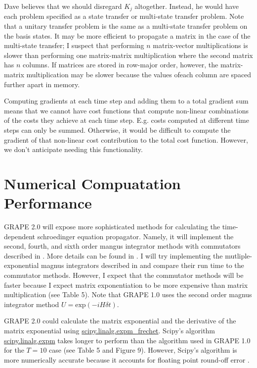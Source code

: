 \documentclass[letterpaper, 12pt]{article}
\begin{document}
Dave believes that we should disregard $K_{j}$ altogether. Instead, he would have each problem specified as a state transfer or multi-state transfer problem. Note that a unitary transfer problem is the same as a multi-state transfer problem on the basis states. It may be more efficient to propagate a matrix in the case of the multi-state transfer; I suspect that performing $n$ matrix-vector multiplications is slower than performing one matrix-matrix multiplication where the second matrix has $n$ columns. If matrices are stored in row-major order, however, the matrix-matrix multiplication may be slower because the values ofeach column are spaced further apart in memory.

Computing gradients at each time step and adding them to a total gradient sum means that we cannot have cost functions that compute non-linear combinations of the costs they achieve at each time step. E.g. costs computed at different time steps can only be summed. Otherwise, it would be difficult to compute the gradient of that non-linear cost contribution to the total cost function. However, we don't anticipate needing this functionality.

\section{Numerical Compuatation Performance}
GRAPE 2.0 will expose more sophisticated methods for calculating the time-dependent schroedinger equation propagator. Namely, it will implement the second, fourth, and sixth order mangus integrator methods with commutators described in \cite{auer2018magnus}. More details can be found in \cite{blanes2009magnus}. I will try implementing the mutliple-exponential magnus integrators described in \cite{auer2018magnus} and compare their run time to the commutator methods. However, I expect that the commutator methods will be faster because I expect matrix exponentiation to be more expensive than matrix multiplication (see Table 5). Note that GRAPE 1.0 uses the second order magnus integrator method $U = \textrm{exp}(-i H \delta t)$.

GRAPE 2.0 could calculate the matrix exponential and the derivative of the matrix exponential using \href{https://docs.scipy.org/doc/scipy-0.14.0/reference/generated/scipy.linalg.expm_frechet.html}{scipy.linalg.expm\_frechet}. Scipy's algorithm \href{https://docs.scipy.org/doc/scipy-0.14.0/reference/generated/scipy.linalg.expm.html#scipy.linalg.expm}{scipy.linalg.expm} takes longer to perform than the algorithm used in GRAPE 1.0 for the $T = 10$ case (see Table 5 and Figure 9). However, Scipy's algorithm is more numerically accurate because it accounts for floating point round-off error \cite{al2009new}.
\end{document}
